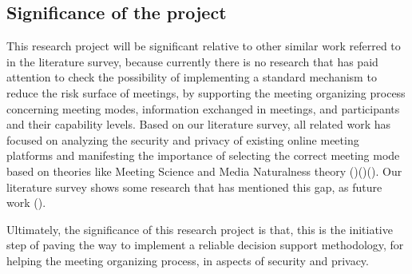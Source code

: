 \begin{spacing}{1.0}
    \subsection{Significance of the project}
    \indent \par This research project will be significant relative to other similar work referred to in the literature survey, because currently there is no research that has paid attention to check the possibility of implementing a standard mechanism to reduce the risk surface of meetings, by supporting the meeting organizing process concerning meeting modes, information exchanged in meetings, and participants and their capability levels. Based on our literature survey, all related work has focused on analyzing the security and privacy of existing online meeting platforms and manifesting the importance of selecting the correct meeting mode based on theories like Meeting Science and Media Naturalness theory (\cite{karl2021})(\cite{hasan2021})(\cite{isobe2021}). Our literature survey shows some research that has mentioned this gap, as future work (\cite{tondel2022}).
    \par Ultimately, the significance of this research project is that, this is the initiative step of paving the way to implement a reliable decision support methodology, for helping the meeting organizing process, in aspects of security and privacy. 


\end{spacing}
